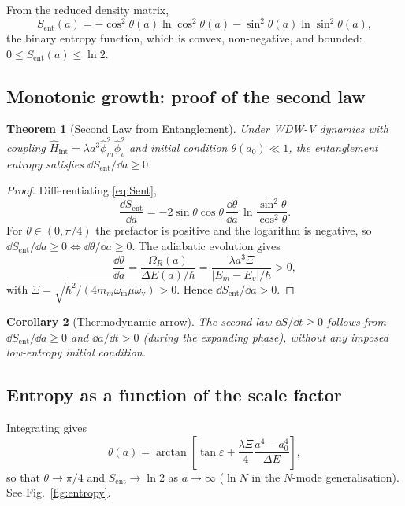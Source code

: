 \documentclass[12pt,a4paper]{article}
\theoremstyle{plain}
\newtheorem{theorem}{Theorem}[section]
\newtheorem{corollary}[theorem]{Corollary}
\theoremstyle{definition}
\newcommand{\Hint}{\hat{H}_{\mathrm{int}}}
\newcommand{\omm}{\omega_{\mathrm{m}}}
\newcommand{\omv}{\omega_{\mathrm{v}}}
\newcommand{\Sent}{S_{\mathrm{ent}}}
\begin{document}
From the reduced density matrix,
\begin{equation}
  \Sent(a) = -\cos^2\!\theta(a)\ln\cos^2\!\theta(a)
             -\sin^2\!\theta(a)\ln\sin^2\!\theta(a),
  \label{eq:Sent}
\end{equation}
the binary entropy function, which is convex, non-negative, and bounded:
$0 \le \Sent(a) \le \ln 2$.

\subsection{Monotonic growth: proof of the second law}

\begin{theorem}[Second Law from Entanglement]
\label{thm:second_law}
Under WDW-V dynamics with coupling
$\Hint = \lambda a^3\hat\phi_m^2\hat\phi_v^2$ and initial condition
$\theta(a_0)\ll 1$, the entanglement entropy satisfies
$\dd\Sent/\dd a \ge 0$.
\end{theorem}

\begin{proof}
Differentiating \eqref{eq:Sent},
\[
  \frac{\dd\Sent}{\dd a}
  = -2\sin\theta\cos\theta\,\frac{\dd\theta}{\dd a}\,
    \ln\frac{\sin^2\!\theta}{\cos^2\!\theta}.
\]
For $\theta\in(0,\pi/4)$ the prefactor is positive and the logarithm is
negative, so $\dd\Sent/\dd a \ge 0 \iff \dd\theta/\dd a \ge 0$.
The adiabatic evolution gives
\[
  \frac{\dd\theta}{\dd a}
  = \frac{\Omega_R(a)}{\Delta E(a)/\hbar}
  = \frac{\lambda a^3\Xi}{|E_m - E_v|/\hbar} > 0,
\]
with $\Xi = \sqrt{\hbar^2/(4m_m\omm\mu\omv)} > 0$.
Hence $\dd\Sent/\dd a > 0$.
\end{proof}

\begin{corollary}[Thermodynamic arrow]
The second law $\dd S/\dd t \ge 0$ follows from $\dd\Sent/\dd a \ge 0$
and $\dd a/\dd t > 0$ (during the expanding phase), without any imposed
low-entropy initial condition.
\end{corollary}

\subsection{Entropy as a function of the scale factor}

Integrating gives
\begin{equation}
  \theta(a) = \arctan\!\left[
    \tan\varepsilon + \frac{\lambda\Xi}{4}\frac{a^4 - a_0^4}{\Delta E}
  \right],
  \label{eq:theta_a}
\end{equation}
so that $\theta\to\pi/4$ and $\Sent\to\ln 2$ as $a\to\infty$
($\ln N$ in the $N$-mode generalisation). See Fig.~\ref{fig:entropy}.
\end{document}
